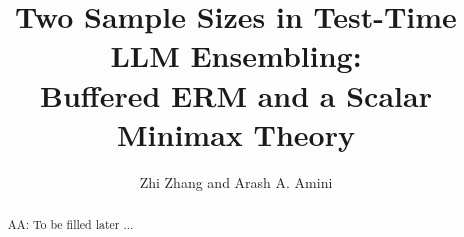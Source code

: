 \documentclass[11pt]{article}
\title{Two Sample Sizes in Test-Time LLM Ensembling:\\
Buffered ERM and a Scalar Minimax Theory}
\author{Zhi Zhang and Arash A. Amini}
\date{}
\def\beta{beta}%
\def\theta{theta}%
\def\infty{infinity}%
\newcommand{\sgn}{\operatorname{sgn}}
\newcommand{\dd}{\,\mathrm d}
\newcommand\aac[1]{{\color{blue!60!black}AA: #1}}
\begin{document}
\maketitle

\begin{abstract}
\aac{To be filled later ...}


\end{abstract}
\end{document}
